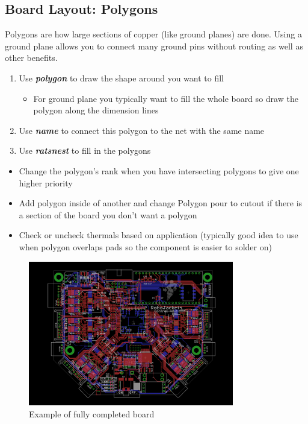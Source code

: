 \documentclass{article}
\begin{document}
\subsection{Board Layout: Polygons}
Polygons are how large sections of copper (like ground planes) are done. Using a ground plane allows you to connect many ground pins without routing as well as other benefits.
\begin{enumerate}
    \item Use \textit{\textbf{polygon}} to draw the shape around you want to
    fill
    \begin{itemize}
        \item For ground plane you typically want to fill the whole board so draw the polygon along the dimension lines
    \end{itemize}
    \item Use \textit{\textbf{name}} to connect this polygon to the net with the same name
    \item Use \textit{\textbf{ratsnest}} to fill in the polygons
\end{enumerate}
\begin{tcolorbox} [title=Tips \& Tricks]
    \begin{itemize}
        \item Change the polygon's rank when you have intersecting polygons to give one higher priority
        \item Add polygon inside of another and change Polygon pour to cutout if there is a section of the board you don't want a polygon
        \item Check or uncheck thermals based on application (typically good idea to use when polygon overlaps pads so the component is easier to solder on)
    \end{itemize}
\end{tcolorbox}

\begin{figure}[!h]
    \center
    \includegraphics[width=0.8\textwidth,height=0.6\textheight,keepaspectratio]{control}
    \caption {Example of fully completed board}
    \label{img:control}
\end{figure}
\end{document}
